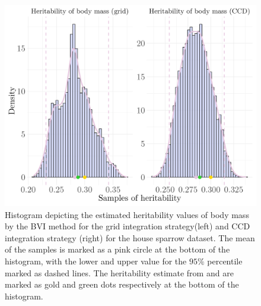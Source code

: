 \begin{figure}[H]
  \centering
  \includegraphics[width=1\linewidth]{Figures/House sparrow study/Heritability_mass_combined.png}
  \caption[Estimated heritability of body mass from grid and CCD strategy]{Histogram depicting the estimated heritability values of body mass by the BVI method for the grid integration strategy(left) and CCD integration strategy (right) for the house sparrow dataset. The mean of the samples is marked as a pink circle at the bottom of the histogram, with the lower and upper value for the $95\%$ percentile marked as dashed lines. The heritability estimate from \citet{Silva2017} and \citet{Muff2019Genetic} are marked as gold and green dots respectively at the bottom of the histogram.}
  \label{fig:heritability_mass_combined}
\end{figure}
